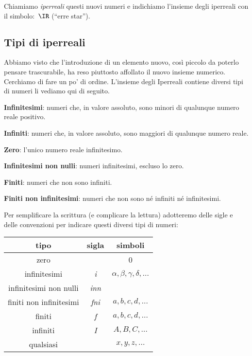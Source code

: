 Chiamiamo \emph{iperreali} questi nuovi numeri e indichiamo l'insieme degli 
iperreali con il simbolo:~\(\IR\) (``erre star'').

\subsection{Tipi di iperreali}
\label{subsec:insnum_iperreali}

Abbiamo visto che l'introduzione di un elemento nuovo, così piccolo
da poterlo pensare trascurabile, ha reso piuttosto affollato il nuovo 
insieme numerico. 
Cerchiamo di fare un po' di ordine. 
L'insieme degli Iperreali contiene diversi tipi di numeri li vediamo qui di 
seguito.

\begin{description} [noitemsep]
 \item \textbf{Infinitesimi}:
numeri che, in valore assoluto, sono minori di qualunque numero reale 
positivo.
 \item \textbf{Infiniti}:
numeri che, in valore assoluto, sono maggiori di qualunque numero reale.
 \item \textbf{Zero}:
l'unico numero reale infinitesimo.
 \item \textbf{Infinitesimi non nulli}:
numeri infinitesimi, escluso lo zero.
 \item \textbf{Finiti}:
numeri che non sono infiniti.
 \item \textbf{Finiti non infinitesimi}:
numeri che non sono né infiniti né infinitesimi.
\end{description}

Per semplificare la scrittura (e complicare la lettura) adotteremo delle 
sigle e delle convenzioni per indicare questi diversi tipi di numeri:

\begin{center}
\begin{tabular}{ccc}\toprule
tipo & sigla & simboli \\\midrule

zero &  & 0 \\

infinitesimi & \emph{i} & 
\(\alpha, \beta, \gamma, \delta, \dots\) \\

infinitesimi non nulli & \emph{inn} & \\

finiti non infinitesimi & \emph{fni} & \(a, b, c, d, \dots\)\\

finiti & \emph{f} & \(a, b, c, d, \dots\) \\

infiniti & \emph{I} & \(A, B, C, \dots\)\\

qualsiasi &  & \(x, y, z, \dots\) \\\bottomrule
\end{tabular}
\label{tab:insnum_tipi}
\end{center}

